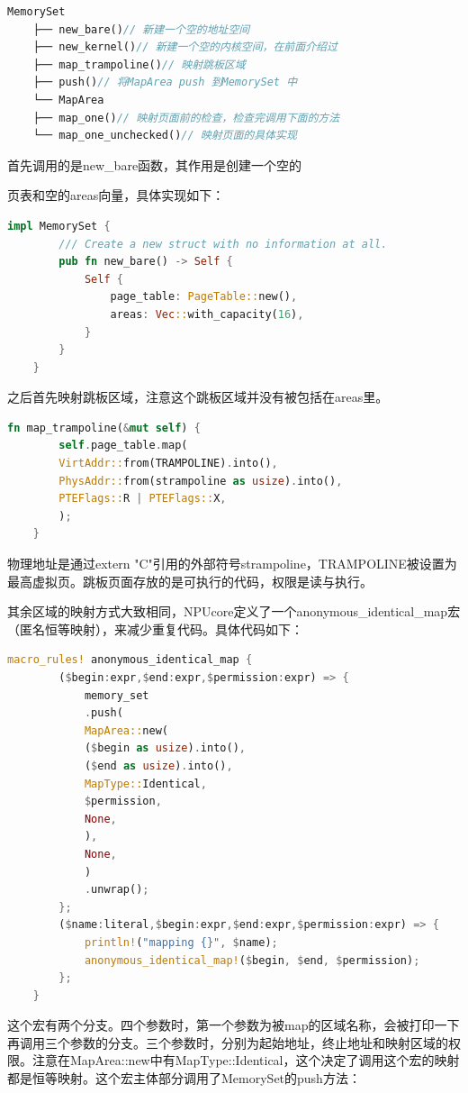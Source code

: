 \begin{lstlisting}[language={Rust}, caption={内核创建}]
	MemorySet
	├── new_bare()// 新建一个空的地址空间
	├── new_kernel()// 新建一个空的内核空间，在前面介绍过
	├── map_trampoline()// 映射跳板区域
	├── push()// 将MapArea push 到MemorySet 中
	└── MapArea
	├── map_one()// 映射页面前的检查，检查完调用下面的方法
	└── map_one_unchecked()// 映射页面的具体实现
\end{lstlisting}
首先调用的是new\_bare函数，其作用是创建一个空的

页表和空的areas向量，具体实现如下：

\begin{lstlisting}[language={Rust}, caption={new\_bare}]
	impl MemorySet {
		/// Create a new struct with no information at all.
		pub fn new_bare() -> Self {
			Self {
				page_table: PageTable::new(),
				areas: Vec::with_capacity(16),
			}
		}
	}
\end{lstlisting}

之后首先映射跳板区域，注意这个跳板区域并没有被包括在areas里。
\begin{lstlisting}[language={Rust}, caption={trampoline}]
	fn map_trampoline(&mut self) {
		self.page_table.map(
		VirtAddr::from(TRAMPOLINE).into(),
		PhysAddr::from(strampoline as usize).into(),
		PTEFlags::R | PTEFlags::X,
		);
	}
\end{lstlisting}

物理地址是通过extern "C"引用的外部符号strampoline，TRAMPOLINE被设置为最高虚拟页。跳板页面存放的是可执行的代码，权限是读与执行。

其余区域的映射方式大致相同，NPUcore定义了一个anonymous\_identical\_map宏（匿名恒等映射），来减少重复代码。具体代码如下：

\begin{lstlisting}[language={Rust},  caption={anonymous\_identical\_map}]
	macro_rules! anonymous_identical_map {
		($begin:expr,$end:expr,$permission:expr) => {
			memory_set
			.push(
			MapArea::new(
			($begin as usize).into(),
			($end as usize).into(),
			MapType::Identical,
			$permission,
			None,
			),
			None,
			)
			.unwrap();
		};
		($name:literal,$begin:expr,$end:expr,$permission:expr) => {
			println!("mapping {}", $name);
			anonymous_identical_map!($begin, $end, $permission);
		};
	}
\end{lstlisting}
这个宏有两个分支。四个参数时，第一个参数为被map的区域名称，会被打印一下再调用三个参数的分支。三个参数时，分别为起始地址，终止地址和映射区域的权限。注意在MapArea::new中有MapType::Identical，这个决定了调用这个宏的映射都是恒等映射。这个宏主体部分调用了MemorySet的push方法：

